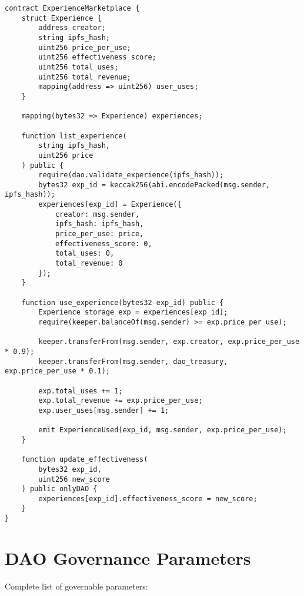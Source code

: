 \documentclass[11pt,letterpaper]{article}
\theoremstyle{definition}
\theoremstyle{remark}
\begin{document}
\begin{verbatim}
contract ExperienceMarketplace {
    struct Experience {
        address creator;
        string ipfs_hash;
        uint256 price_per_use;
        uint256 effectiveness_score;
        uint256 total_uses;
        uint256 total_revenue;
        mapping(address => uint256) user_uses;
    }

    mapping(bytes32 => Experience) experiences;

    function list_experience(
        string ipfs_hash,
        uint256 price
    ) public {
        require(dao.validate_experience(ipfs_hash));
        bytes32 exp_id = keccak256(abi.encodePacked(msg.sender, ipfs_hash));
        experiences[exp_id] = Experience({
            creator: msg.sender,
            ipfs_hash: ipfs_hash,
            price_per_use: price,
            effectiveness_score: 0,
            total_uses: 0,
            total_revenue: 0
        });
    }

    function use_experience(bytes32 exp_id) public {
        Experience storage exp = experiences[exp_id];
        require(keeper.balanceOf(msg.sender) >= exp.price_per_use);

        keeper.transferFrom(msg.sender, exp.creator, exp.price_per_use * 0.9);
        keeper.transferFrom(msg.sender, dao_treasury, exp.price_per_use * 0.1);

        exp.total_uses += 1;
        exp.total_revenue += exp.price_per_use;
        exp.user_uses[msg.sender] += 1;

        emit ExperienceUsed(exp_id, msg.sender, exp.price_per_use);
    }

    function update_effectiveness(
        bytes32 exp_id,
        uint256 new_score
    ) public onlyDAO {
        experiences[exp_id].effectiveness_score = new_score;
    }
}
\end{verbatim}

\section{DAO Governance Parameters}

Complete list of governable parameters:
\end{document}
